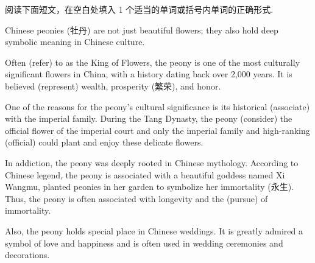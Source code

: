 \documentclass{英语试卷}
\begin{document}
\par 阅读下面短文，在空白处填入 1 个适当的单词或括号内单词的正确形式.\par
\par Chinese peonies (牡丹) are not just beautiful flowers; they also hold deep symbolic meaning in Chinese culture.\par
\par Often  (refer) to as the King of Flowers, the peony is one of the most culturally significant flowers in China, with a history dating back over 2,000 years. It is believed  (represent) wealth, prosperity (繁荣), and honor.\par
\par One of the reasons for the peony's cultural significance is its historical  (associate) with the imperial family. During the Tang Dynasty, the peony  (consider) the official flower of the imperial court and only the imperial family and high-ranking  (official) could plant and enjoy these delicate flowers.\par
\par In addiction, the peony was deeply rooted in Chinese mythology. According to Chinese legend, the peony is associated with a beautiful goddess named Xi Wangmu,  planted peonies in her garden to symbolize her immortality (永生). Thus, the peony is often associated with longevity and the  (pursue) of immortality.\par
\par Also, the peony holds  special place in Chinese weddings. It is greatly admired  a symbol of love and happiness and is often used in wedding ceremonies and decorations.\par
\end{document}
